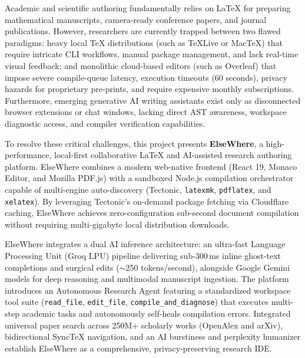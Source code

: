 \documentclass[12pt,a4paper,twoside]{article}
\newcommand{\emptypara}{\mbox{}\par}
\newcommand{\code}[1]{\texttt{#1}}
\begin{document}
\begin{sloppypar}
\noindent Academic and scientific authoring fundamentally relies on \LaTeX{} for preparing mathematical manuscripts, camera-ready conference papers, and journal publications. However, researchers are currently trapped between two flawed paradigms: heavy local \TeX{} distributions (such as \TeX{}Live or Mac\TeX{}) that require intricate CLI workflows, manual package management, and lack real-time visual feedback; and monolithic cloud-based editors (such as Overleaf) that impose severe compile-queue latency, execution timeouts (60 seconds), privacy hazards for proprietary pre-prints, and require expensive monthly subscriptions. Furthermore, emerging generative AI writing assistants exist only as disconnected browser extensions or chat windows, lacking direct AST awareness, workspace diagnostic access, and compiler verification capabilities.\par

\emptypara
\noindent To resolve these critical challenges, this project presents \textbf{ElseWhere}, a high-performance, local-first collaborative \LaTeX{} and AI-assisted research authoring platform. ElseWhere combines a modern web-native frontend (React 19, Monaco Editor, and Mozilla PDF.js) with a sandboxed Node.js compilation orchestrator capable of multi-engine auto-discovery (Tectonic, \code{latexmk}, \code{pdflatex}, and \code{xelatex}). By leveraging Tectonic's on-demand package fetching via Cloudflare caching, ElseWhere achieves zero-configuration sub-second document compilation without requiring multi-gigabyte local distribution downloads.\par

\emptypara
\noindent ElseWhere integrates a dual AI inference architecture: an ultra-fast Language Processing Unit (Groq LPU) pipeline delivering sub-300\,ms inline ghost-text completions and surgical edits ($\sim$250 tokens/second), alongside Google Gemini models for deep reasoning and multimodal manuscript ingestion. The platform introduces an Autonomous Research Agent featuring a standardized workspace tool suite (\code{read\_file}, \code{edit\_file}, \code{compile\_and\_diagnose}) that executes multi-step academic tasks and autonomously self-heals compilation errors. Integrated universal paper search across 250M+ scholarly works (OpenAlex and arXiv), bidirectional Sync\TeX{} navigation, and an AI burstiness and perplexity humanizer establish ElseWhere as a comprehensive, privacy-preserving research IDE.\par
\end{sloppypar}
\end{document}
